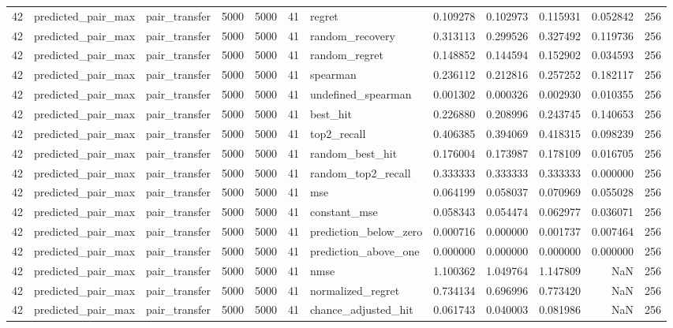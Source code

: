 \begin{tabular}{rllrrrlrrrrr}
42 & predicted_pair_max & pair_transfer & 5000 & 5000 & 41 & regret & 0.109278 & 0.102973 & 0.115931 & 0.052842 & 256 \\
42 & predicted_pair_max & pair_transfer & 5000 & 5000 & 41 & random_recovery & 0.313113 & 0.299526 & 0.327492 & 0.119736 & 256 \\
42 & predicted_pair_max & pair_transfer & 5000 & 5000 & 41 & random_regret & 0.148852 & 0.144594 & 0.152902 & 0.034593 & 256 \\
42 & predicted_pair_max & pair_transfer & 5000 & 5000 & 41 & spearman & 0.236112 & 0.212816 & 0.257252 & 0.182117 & 256 \\
42 & predicted_pair_max & pair_transfer & 5000 & 5000 & 41 & undefined_spearman & 0.001302 & 0.000326 & 0.002930 & 0.010355 & 256 \\
42 & predicted_pair_max & pair_transfer & 5000 & 5000 & 41 & best_hit & 0.226880 & 0.208996 & 0.243745 & 0.140653 & 256 \\
42 & predicted_pair_max & pair_transfer & 5000 & 5000 & 41 & top2_recall & 0.406385 & 0.394069 & 0.418315 & 0.098239 & 256 \\
42 & predicted_pair_max & pair_transfer & 5000 & 5000 & 41 & random_best_hit & 0.176004 & 0.173987 & 0.178109 & 0.016705 & 256 \\
42 & predicted_pair_max & pair_transfer & 5000 & 5000 & 41 & random_top2_recall & 0.333333 & 0.333333 & 0.333333 & 0.000000 & 256 \\
42 & predicted_pair_max & pair_transfer & 5000 & 5000 & 41 & mse & 0.064199 & 0.058037 & 0.070969 & 0.055028 & 256 \\
42 & predicted_pair_max & pair_transfer & 5000 & 5000 & 41 & constant_mse & 0.058343 & 0.054474 & 0.062977 & 0.036071 & 256 \\
42 & predicted_pair_max & pair_transfer & 5000 & 5000 & 41 & prediction_below_zero & 0.000716 & 0.000000 & 0.001737 & 0.007464 & 256 \\
42 & predicted_pair_max & pair_transfer & 5000 & 5000 & 41 & prediction_above_one & 0.000000 & 0.000000 & 0.000000 & 0.000000 & 256 \\
42 & predicted_pair_max & pair_transfer & 5000 & 5000 & 41 & nmse & 1.100362 & 1.049764 & 1.147809 & NaN & 256 \\
42 & predicted_pair_max & pair_transfer & 5000 & 5000 & 41 & normalized_regret & 0.734134 & 0.696996 & 0.773420 & NaN & 256 \\
42 & predicted_pair_max & pair_transfer & 5000 & 5000 & 41 & chance_adjusted_hit & 0.061743 & 0.040003 & 0.081986 & NaN & 256 \\

\end{tabular}
